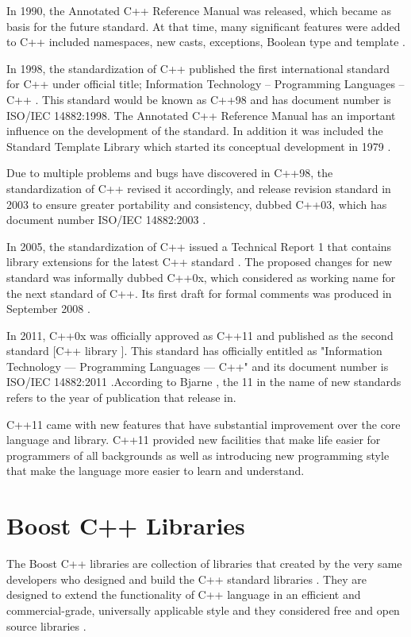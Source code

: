 \documentclass[11pt]{report}
\begin{document}
In 1990, the Annotated C++ Reference Manual was released, which became as basis for the future standard. At that time, many significant features were added to C++ included namespaces, new casts, exceptions, Boolean type and template \cite{StroustrupHistory}.

In 1998, the standardization of C++ published the first international standard for C++ under official title; Information Technology -- Programming Languages -- C++ \cite{Josuttis:2012:CppStandardLibrary}. This standard would be known as C++98 and has document number is ISO/IEC 14882:1998. The Annotated C++ Reference Manual has an important influence on the development of the standard.  In addition it was included the Standard Template Library which started its conceptual development in 1979 \cite{CplusplusHistoryofCpp}.  

Due to multiple problems and bugs have discovered in C++98, the standardization of C++ revised it accordingly, and release revision standard in 2003 to ensure greater portability and consistency, dubbed C++03, which has document number ISO/IEC 14882:2003 \cite{Josuttis:2012:CppStandardLibrary}.

In 2005, the standardization of C++ issued a Technical Report 1 that contains library extensions for the latest C++ standard \cite{Josuttis:2012:CppStandardLibrary}. The proposed changes for new standard was informally dubbed C++0x, which considered as working name for the next standard of C++. Its first draft for formal comments was produced in September 2008 \cite{CplusplusHistoryofCpp}. 

In 2011, C++0x was officially approved as C++11 and published as the second standard [C++ library ]. This standard has officially entitled as "Information Technology — Programming Languages — C++" and its document number is ISO/IEC 14882:2011 \cite{Josuttis:2012:CppStandardLibrary}.According to Bjarne \cite{Stroustrup:2012:Cpp11}, the 11 in the name of new standards refers to the year of publication that release in.

C++11 came with new features that have substantial improvement over the core language and library. C++11 provided new facilities that make life easier for programmers of all backgrounds as well as introducing new programming style  that make the language more easier to learn and understand.

\section{Boost C++ Libraries}
\label{sec: Boost}
The Boost C++ libraries are collection of libraries that created by the very same developers who designed and build the C++ standard libraries \cite{Schaling:2011:BoostCppLibraries}. They are designed to extend the functionality of C++ language in an efficient and commercial-grade, universally applicable style \cite{Boost:2007:Cpp} and they considered free and open source libraries \cite{Deitel:2012:CPP}.
\end{document}

